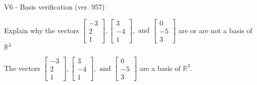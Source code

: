 \begin{exercise}
  \begin{exerciseTitle}V6 - Basis verification (ver. 957)\end{exerciseTitle}
  \begin{exerciseStatement}
    Explain why the vectors \(\left[\begin{array}{r}
-3 \\
2 \\
1
\end{array}\right] , \left[\begin{array}{r}
3 \\
-4 \\
1
\end{array}\right] , \text{ and } \left[\begin{array}{r}
0 \\
-5 \\
3
\end{array}\right]\) are or are not a basis of \(\mathbb{R}^3\)	


  \end{exerciseStatement}
  \begin{exerciseAnswer}
   The vectors \(\left[\begin{array}{r}
-3 \\
2 \\
1
\end{array}\right] , \left[\begin{array}{r}
3 \\
-4 \\
1
\end{array}\right] , \text{ and } \left[\begin{array}{r}
0 \\
-5 \\
3
\end{array}\right]\) 
  	 are  a basis of \(\mathbb{R}^3\).
  


  \end{exerciseAnswer}
\end{exercise}